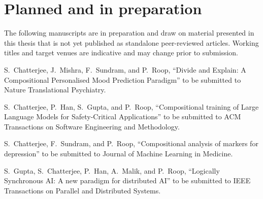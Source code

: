 \section{Planned and in preparation}

The following manuscripts are in preparation and draw on material presented in this thesis that is not yet published as standalone peer-reviewed articles. Working titles and target venues are indicative and may change prior to submission.

\begin{enumerate}[label={[\arabic*]}, leftmargin=*, itemsep=0.75em]

\item S.~Chatterjee, J.~Mishra, F.~Sundram, and P.~Roop, ``Divide and Explain: A Compositional Personalised Mood Prediction Paradigm'' to be submitted to Nature Translational Psychiatry.

\item S.~Chatterjee, P.~Han, S.~Gupta, and P.~Roop, ``Compositional training of Large Language Models for Safety-Critical Applications'' to be submitted to ACM Transactions on Software Engineering and Methodology.

\item S.~Chatterjee, F.~Sundram, and P.~Roop, ``Compositional analysis of markers for depression'' to be submitted to Journal of Machine Learning in Medicine.

\item S.~Gupta, S.~Chatterjee, P.~Han, A.~Malik, and P.~Roop, ``Logically Synchronous AI: A new paradigm for distributed AI'' to be submitted to IEEE Transactions on Parallel and Distributed Systems.
\end{enumerate}
